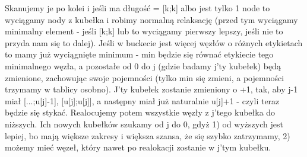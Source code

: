 Skanujemy je po kolei i jeśli ma długość = [k;k] albo jest tylko 1 node to wyciągamy nody z kubełka i robimy normalną relaksację (przed tym wyciągamy minimalny element - jeśli [k;k] lub to wyciągamy pierwszy lepszy, jeśli nie to przyda nam się to dalej). Jeśli w buckecie jest więcej węzłów o różnych etykietach to mamy już wyciągnięte minimum - min będzie się równać etykiecie tego minimalnego węzła, a pozostałe od 0 do j (gdzie badamy j'ty kubełek) będą zmienione, zachowując swoje pojemności (tylko min się zmieni, a pojemności trzymamy w tablicy osobno). J'ty kubełek zostanie zmieniony o +1, tak, aby j-1 miał [...;u[j]-1], [u[j];u[j]], a następny miał już naturalnie u[j]+1 - czyli teraz będzie się stykać. Realocujemy potem wszystkie węzły z j'tego kubełka do niższych. Ich nowych kubełków szukamy od j do 0, gdyż 1) od wyższych jest lepiej, bo mają większe zakresy i większa szansa, że się szybko zatrzymamy, 2) możemy mieć węzeł, który nawet po realokacji zostanie w j'tym kubełku.


